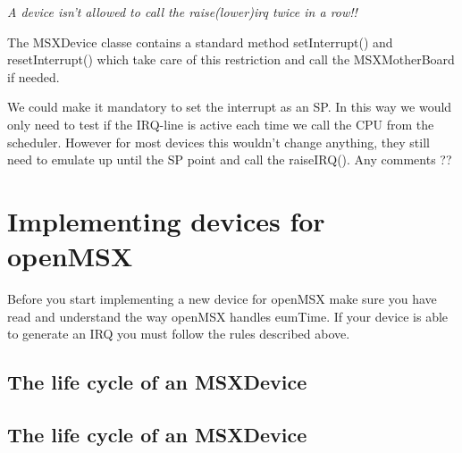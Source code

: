 \documentclass[11pt, a4paper]{report}
\begin{document}
\emph{A device isn't allowed to call the raise(lower)irq twice in a row!!}

The MSXDevice classe contains a standard method setInterrupt() and
resetInterrupt() which take care of this restriction and call the
MSXMotherBoard if needed.

We could make it mandatory to set the interrupt as an SP. In this way we
would only need to test if the IRQ-line is active each time we call the
CPU from the scheduler. However for most devices this wouldn't change
anything, they still need to emulate up until the SP point and call the
raiseIRQ(). Any comments ??

\chapter{Implementing devices for openMSX}
Before you start implementing a new device for openMSX make sure you have read and understand the way openMSX handles eumTime. If your device is able to generate an IRQ you must follow the rules described above.
\section{The life cycle of an MSXDevice}

\section{The life cycle of an MSXDevice}
\end{document}
